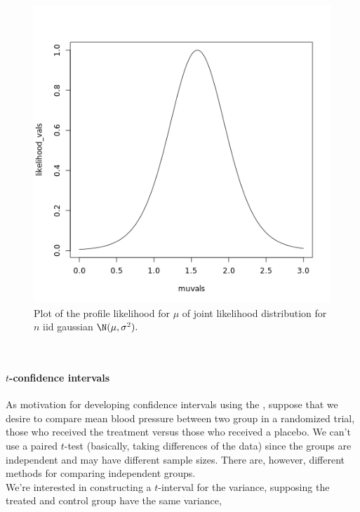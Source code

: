 \documentclass{homework}
\begin{document}
\begin{figure}
    \centering
    \includegraphics[scale=0.5]{figs/plotting profile likelihood for mu.png}
    \caption{Plot of the profile likelihood for $\mu$ of joint likelihood distribution for $n$ iid gaussian $\N(\mu,\sigma^2).$}
    \label{fig:prof_lik}
\end{figure}

\textnormal{ } \\

\paragraph{\textbf{{$t$-confidence intervals}}}

As motivation for developing confidence intervals using the \tdis, suppose that we desire to compare mean blood pressure between two group in a randomized trial, those who received the treatment versus those who received a placebo. We can't use a paired $t$-test (basically, taking differences of the data) since the groups are independent and may have different sample sizes. There are, however, different methods for comparing independent groups. \\

We're interested in constructing a $t$-interval for the variance, supposing the treated and control group have the same variance, 
\end{document}
